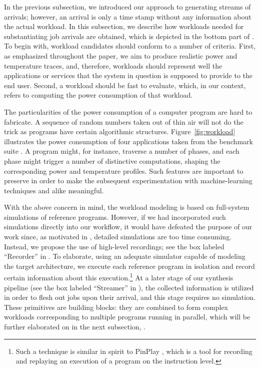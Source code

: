 
In the previous subsection, we introduced our approach to generating streams of
arrivals; however, an arrival is only a time stamp without any information about
the actual workload. In this subsection, we describe how workloads needed for
substantiating job arrivals are obtained, which is depicted in the bottom part
of . To begin with, workload candidates should conform to a
number of criteria. First, as emphasized throughout the paper, we aim to produce
realistic power and temperature traces, and, therefore, workloads should
represent well the applications or services that the system in question is
supposed to provide to the end user. Second, a workload should be fast to
evaluate, which, in our context, refers to computing the power consumption of
that workload.

The particularities of the power consumption of a computer program are hard to
fabricate. A sequence of random numbers taken out of thin air will not do the
trick as programs have certain algorithmic structures.
Figure~\ref{fig:workload} illustrates the power consumption of four applications
taken from the  benchmark suite \cite{cpu2006}. A program
might, for instance, traverse a number of phases, and each phase might trigger a
number of distinctive computations, shaping the corresponding power and
temperature profiles. Such features are important to preserve in order to make
the subsequent experimentation with machine-learning techniques and alike
meaningful.

With the above concern in mind, the workload modeling is based on full-system
simulations of reference programs. However, if we had incorporated such
simulations directly into our workflow, it would have defeated the purpose of
our work since, as motivated in , detailed simulations are too
time consuming. Instead, we propose the use of high-level recordings; see the
box labeled ``Recorder'' in . To elaborate, using an adequate
simulator capable of modeling the target architecture, we execute each reference
program in isolation and record certain information about this
execution.\footnote{Such a technique is similar in spirit to PinPlay
\cite{patil2010}, which is a tool for recording and replaying an execution of a
program on the instruction level.} At a later stage of our synthesis pipeline
(see the box labeled ``Streamer'' in ), the collected
information is utilized in order to flesh out jobs upon their arrival, and this
stage requires no simulation. These primitives are building blocks: they are
combined to form complex workloads corresponding to multiple programs running in
parallel, which will be further elaborated on in the next subsection,
.

